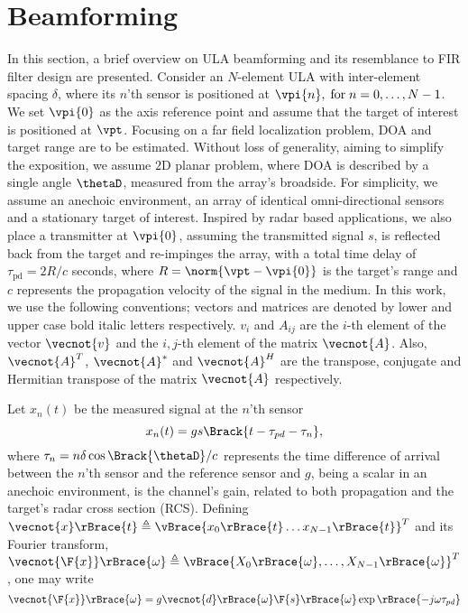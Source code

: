 \section{Beamforming}\label{sec:setup}
In this section, a brief overview on ULA beamforming and its resemblance to FIR filter design are presented.
Consider an $N$-element ULA with inter-element spacing $\delta$, where its $n$'th sensor is positioned at $\vpi{n},\;\text{for}\; n=0,\ldots,N-1$. We set $\vpi{0}$ as the axis reference point and assume that the target of interest is positioned at $\vpt$.
Focusing on a far field localization problem, DOA and target range are to be estimated. Without loss of generality, aiming to simplify the exposition, we assume $2\text{D}$ planar problem, where DOA is described by a single angle $\thetaD$, measured from the array's broadside.
For simplicity, we assume an anechoic environment, an array of identical omni-directional sensors and a stationary target of interest.
Inspired by radar based applications, we also place a transmitter at $\vpi{0}$, assuming the transmitted signal $s$, is reflected back from the target and re-impinges the array, with a total time delay of $\tau_{\text{pd}}=2R/c$ seconds, where $R = \norm{\vpt-\vpi{0}}$ is the target's range and $c$ represents the propagation velocity of the signal in the medium.
In this work, we use the following conventions; vectors and matrices are denoted by lower and upper case bold italic letters respectively. 
$v_{i}$ and $A_{ij}$ are the $i$-th element of the vector $\vecnot{v}$ and the $i,j$-th element of the matrix $\vecnot{A}$.
Also, $\vecnot{A}^{T}$, $\vecnot{A}^{*}$ and $\vecnot{A}^{H}$ are the transpose, conjugate and Hermitian transpose of the matrix $\vecnot{A}$ respectively.
\par Let $x_{n}(t)$ be the measured signal at the $n$'th sensor
\begin{equation}
x_{n}(t) = gs\Brack{t-\tau_{pd}-\tau_{n}},
\label{eqn:noFeedbackULA_singleSensor_temporal}
\end{equation}
where $\tau_{n}=n\delta\cos\Brack{\thetaD}/c$ represents the time difference of arrival between the $n$'th sensor and the reference sensor and $g$, being a scalar in an anechoic environment, is the channel's gain, related to both propagation and the target's radar cross section (RCS).
Defining $\vecnot{x}\rBrace{t}\triangleq\vBrace{x_{0}\rBrace{t}\hdots{}x_{N-1}\rBrace{t}}^{T}$ and its Fourier transform, $\vecnot{\F{x}}\rBrace{\omega}\triangleq\vBrace{X_{0}\rBrace{\omega},\hdots,X_{N-1}\rBrace{\omega}}^{T}$, one may write 
\[
\vecnot{\F{x}}\rBrace{\omega}=g\vecnot{d}\rBrace{\omega}\F{s}\rBrace{\omega}\exp{\rBrace{-j\omega\tau_{pd}}}
\]
